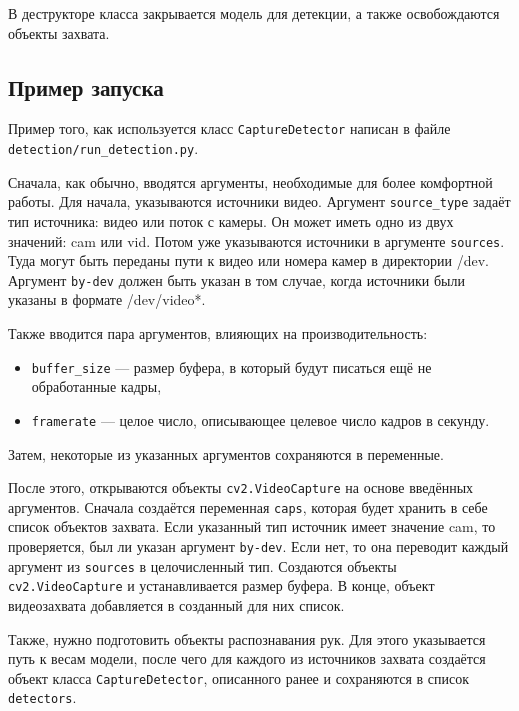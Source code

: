 \documentclass[14pt, a4paper]{extarticle}
\begin{document}
В деструкторе класса закрывается модель для детекции, а также освобождаются объекты захвата.

\subsection{Пример запуска}
Пример того, как используется класс \texttt{CaptureDetector} написан в файле\\
\texttt{detection/run\_detection.py}.

Сначала, как обычно, вводятся аргументы, необходимые для более комфортной работы.
Для начала, указываются источники видео. Аргумент \texttt{source\_type} задаёт
тип источника: видео или поток с камеры. Он может иметь одно из двух значений:
cam или vid. Потом уже указываются источники в аргументе \texttt{sources}. Туда могут быть переданы пути к видео или номера камер в директории /dev. Аргумент \texttt{by-dev} должен быть указан в том случае, когда источники были указаны в формате /dev/video*.

Также вводится пара аргументов, влияющих на производительность:
\begin{itemize}
  \item \texttt{buffer\_size} --- размер буфера, в который будут писаться ещё не обработанные кадры,
  \item \texttt{framerate} --- целое число, описывающее целевое число кадров в секунду.
\end{itemize}

Затем, некоторые из указанных аргументов сохраняются в переменные.

После этого, открываются объекты \texttt{cv2.VideoCapture} на основе введённых
аргументов. Сначала создаётся переменная \texttt{caps}, которая будет хранить в
себе список объектов захвата. Если указанный тип источник имеет значение cam,
то проверяется, был ли указан аргумент \texttt{by-dev}. Если нет, то она
переводит каждый аргумент из \texttt{sources} в целочисленный тип. Создаются
объекты \texttt{cv2.VideoCapture} и устанавливается размер буфера. В конце,
объект видеозахвата добавляется в созданный для них список.

Также, нужно подготовить объекты распознавания рук. Для этого указывается путь
к весам модели, после чего для каждого из источников захвата создаётся объект
класса \texttt{CaptureDetector}, описанного ранее и сохраняются в список \texttt{detectors}.
\end{document}
